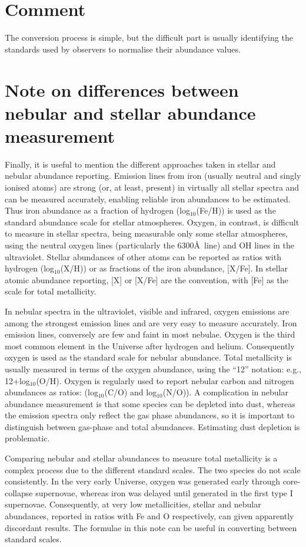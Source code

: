 \section{Comment}
The conversion process is simple, but the difficult part is usually identifying the standards used by observers to normalise their abundance values.

\section{Note on differences between nebular and stellar abundance measurement}
Finally, it is useful to mention the different approaches taken in stellar and nebular abundance reporting. Emission lines from iron (usually neutral and singly ionised atoms) are strong (or, at least, present) in virtually all stellar spectra and can be measured accurately, enabling reliable iron abundances to be estimated. Thus iron abundance as a fraction of hydrogen (log$_{10}$(Fe/H)) is used as the standard abundance scale for stellar atmospheres. Oxygen, in contrast, is difficult to measure in stellar spectra, being measurable only some stellar atmospheres, using the neutral oxygen lines (particularly the 6300\AA\ line) and OH lines in the ultraviolet.  Stellar abundances of other atoms can be reported as ratios with hydrogen (log$_{10}$(X/H)) or as fractions of the iron abundance, [X/Fe]. In stellar atomic abundance reporting, [X] or [X/Fe] are the convention, with [Fe] as the scale for total metallicity.

In nebular spectra in the ultraviolet, visible and infrared, oxygen emissions are among the strongest emission lines and are very easy to measure accurately. Iron emission lines, conversely are few and faint in most nebulae.  Oxygen is the third most common element in the Universe after hydrogen and helium. Consequently oxygen is used as the standard scale for nebular abundance. Total metallicity is usually measured in terms of the oxygen abundance, using the ``12'' notation: e.g., 12+log$_{10}$(O/H). Oxygen is regularly used to report nebular carbon and nitrogen abundances as ratios: (log$_{10}$(C/O) and log$_{10}$(N/O)). A complication in nebular abundance measurement is that some species can be depleted into dust, whereas the emission spectra only reflect the gas phase abundances, so it is important to distinguish between gas-phase and total abundances. Estimating dust depletion is problematic.

Comparing nebular and stellar abundances to measure total metallicity is a complex process due to the different standard scales.  The two species do not scale consistently.  In the very early Universe, oxygen was generated early through core-collapse supernovae, whereas iron was delayed until generated in the first type I supernovae. Consequently, at very low metallicities, stellar and nebular abundances, reported in ratios with Fe and O respectively, can given apparently discordant results.  The formulae in this note can be useful in converting between standard scales.

  
  
  
  
  
  
  
  
  
  
  
  
  
  
  
  
  
